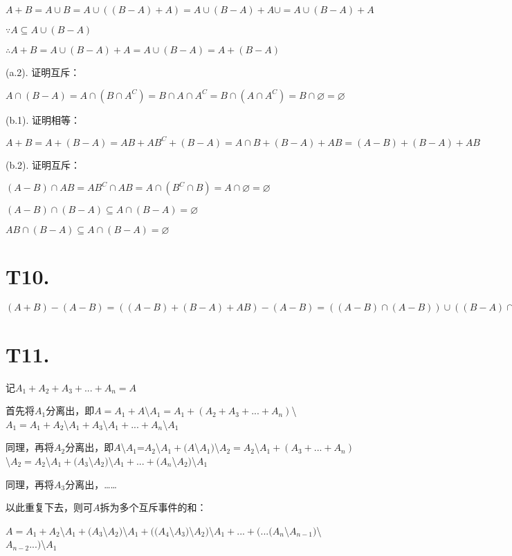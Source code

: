 \documentclass[utf8]{article}
\begin{document}
$A+B=A\cup B=A\cup ((B-A)+A)=A\cup (B-A)+A\cup =A\cup (B-A)+A$

$\because A\subseteq A\cup (B-A)$

$\therefore A+B=A\cup (B-A)+A=A\cup (B-A)=A+(B-A)$

(a.2). 证明互斥：

$A\cap (B-A)=A\cap (B\cap A^C)=B\cap A\cap A^C=B\cap (A\cap A^C)=B\cap \varnothing=\varnothing$

(b.1). 证明相等：

$A+B=A+(B-A)=AB+AB^C+(B-A)=A\cap B+(B-A)+AB=(A-B)+(B-A)+AB$

(b.2). 证明互斥：

$(A-B)\cap AB=AB^C\cap AB=A\cap (B^C\cap B)=A\cap \varnothing=\varnothing$

$(A-B)\cap (B-A)\subseteq A\cap (B-A)=\varnothing$

$AB\cap (B-A)\subseteq A\cap (B-A)=\varnothing$

\section*{T10. }


$(A+B)-(A-B)=((A-B)+(B-A)+AB)-(A-B)=((A-B)\cap (A-B))\cup ((B-A)\cap (A-B))\cup (AB\cap (A-B))=\varnothing \cup \varnothing \cup \varnothing= \varnothing$

\section*{T11. }

记$A_1+A_2+A_3+...+A_n=A$

首先将$A_1$分离出，即$A=A_1+A$\textbackslash$A_1=A_1+(A_2+A_3+...+A_n)$\textbackslash$A_1=A_1+A_2$\textbackslash$A_1+A_3$\textbackslash$A_1+...+A_n$\textbackslash$A_1$

同理，再将$A_2$分离出，即$A$\textbackslash$A_1$=$A_2$\textbackslash$A_1+(A$\textbackslash$A_1)$\textbackslash$A_2=A_2$\textbackslash$A_1+(A_3+...+A_n)$\textbackslash$A_2=A_2$\textbackslash$A_1+(A_3$\textbackslash$A_2)$\textbackslash$A_1+...+(A_n$\textbackslash$A_2)$\textbackslash$A_1$

同理，再将$A_3$分离出，……

以此重复下去，则可$A$拆为多个互斥事件的和：

$A=A_1+A_2$\textbackslash$A_1+(A_3$\textbackslash$A_2)$\textbackslash$A_1+((A_4$\textbackslash$A_3)$\textbackslash$A_2)$\textbackslash$A_1+...+(...(A_n$\textbackslash$A_{n-1})$\textbackslash$A_{n-2}...)$\textbackslash$A_1$
\end{document}
